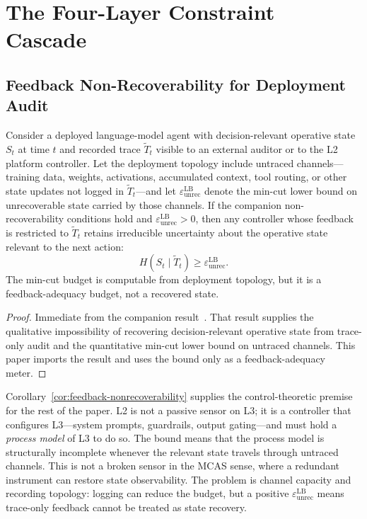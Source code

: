 \section{The Four-Layer Constraint Cascade}\label{sec:cascade}

\subsection{Feedback Non-Recoverability for Deployment Audit}

\begin{corollary}\label{cor:feedback-nonrecoverability}
Consider a deployed language-model agent with decision-relevant operative state $S_t$ at time $t$ and recorded trace $\tilde T_t$ visible to an external auditor or to the L2 platform controller. Let the deployment topology include untraced channels---training data, weights, activations, accumulated context, tool routing, or other state updates not logged in $\tilde T_t$---and let $\varepsilon_{\mathrm{unrec}}^{\mathrm{LB}}$ denote the min-cut lower bound on unrecoverable state carried by those channels. If the companion non-recoverability conditions hold and $\varepsilon_{\mathrm{unrec}}^{\mathrm{LB}}>0$, then any controller whose feedback is restricted to $\tilde T_t$ retains irreducible uncertainty about the operative state relevant to the next action:
\[
H(S_t\mid\tilde T_t)\ge \varepsilon_{\mathrm{unrec}}^{\mathrm{LB}}.
\]
The min-cut budget is computable from deployment topology, but it is a feedback-adequacy budget, not a recovered state.
\end{corollary}

\begin{proof}
Immediate from the companion result~\cite{anon2026dual}. That result supplies the qualitative impossibility of recovering decision-relevant operative state from trace-only audit and the quantitative min-cut lower bound on untraced channels. This paper imports the result and uses the bound only as a feedback-adequacy meter.
\end{proof}

Corollary~\ref{cor:feedback-nonrecoverability} supplies the control-theoretic premise for the rest of the paper. L2 is not a passive sensor on L3; it is a controller that configures L3---system prompts, guardrails, output gating---and must hold a \emph{process model} of L3 to do so. The bound means that the process model is structurally incomplete whenever the relevant state travels through untraced channels. This is not a broken sensor in the MCAS sense, where a redundant instrument can restore state observability. The problem is channel capacity and recording topology: logging can reduce the budget, but a positive $\varepsilon_{\mathrm{unrec}}^{\mathrm{LB}}$ means trace-only feedback cannot be treated as state recovery.

